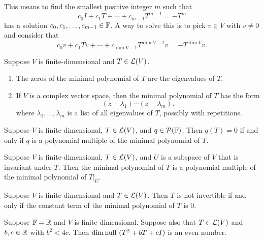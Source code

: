 \documentclass{extarticle}
\begin{document}
\begin{remark}
    This means to find the smallest positive integer \(m\) such that 
    \[c_0 I + c_1 T + \cdots + c_{m-1}T^{m-1} = -T^{m}\]
    has a solution \(c_0, c_1, \ldots, c_{m-1} \in \mathbb{F}\). A way to solve this is to pick \(v \in V\) 
    with \(v \neq 0\) and consider that 
    \[c_0 v + c_1 Tv + \cdots + c_{\dim V - 1} T^{\dim V - 1} v = - T^{\dim V}v.\]
\end{remark}

\begin{thm}
    Suppose \(V\) is finite-dimensional and \(T \in \mathcal{L}(V)\). 
    \begin{enumerate}[label=(\alph*)]
        \item The zeros of the minimal polynomial of \(T\) are the eigenvalues of \(T\). 
        \item If \(V\) is a complex vector space, then the minimal polynomial of \(T\) has the 
        form 
        \[(z - \lambda_1) \cdots (z-\lambda_m).\]
        where \(\lambda_1, \ldots, \lambda_m\) is a list of all eigenvalues of \(T\), possibly with repetitions.
    \end{enumerate}
\end{thm}

\begin{thm}[\(q(T) = 0 \Longleftrightarrow q\) is a polynomial multiple of the minimal polynomial]
    Suppose \(V\) is finite-dimensional, \(T \in \mathcal{L}(V)\), and \(q \in \mathcal{P}(\mathbb{F})\). Then 
    \(q(T) = 0\) if and only if \(q\) is a polynomial multiple of the minimal polynomial of \(T\).
\end{thm}

\begin{thm}
    Suppose \(V\) is finite-dimensional, \(T \in \mathcal{L}(V)\), and \(U\) is a subspace of \(V\) that is invariant 
    under \(T\). Then the minimal polynomial of \(T\) is a polynomial multiple of the minimal polynomial of 
    \(T |_U\).
\end{thm}

\begin{corollary}
    Suppose \(V\) is finite-dimensional and \(T \in \mathcal{L}(V)\). Then \(T\) is not invertible if and only if the 
    constant term of the minimal polynomial of \(T\) is 0.
\end{corollary}

\begin{thm}
    Suppose \(\mathbb{F} = \mathbb{R}\) and \(V\) is finite-dimensional. Suppose also that \(T \in \mathcal{L}(V)\) and 
    \(b, c \in \mathbb{R}\) with \(b^2 < 4c\). Then \(\dim \text{null }(T^2 + bT +cI)\) is an even number.
\end{thm}
\end{document}
